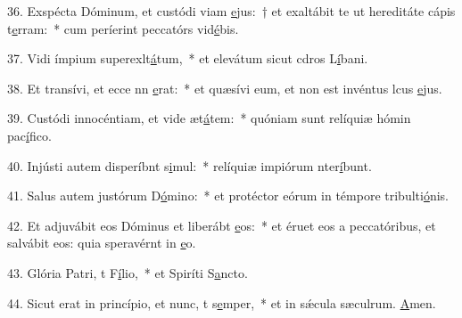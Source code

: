 36. Exspécta Dóminum, et custódi viam \uline{e}jus:~† et exaltábit te ut hereditáte cápis t\uline{e}rram:~* cum períerint peccatórs vid\uline{é}bis.\par 
37. Vidi ímpium superexlt\uline{á}tum,~* et elevátum sicut cdros L\uline{í}bani.\par 
38. Et transívi, et ecce nn \uline{e}rat:~* et quæsívi eum, et non est invéntus lcus \uline{e}jus.\par 
39. Custódi innocéntiam, et vide æt\uline{á}tem:~* quóniam sunt relíquiæ hómin pac\uline{í}fico.\par 
40. Injústi autem disperíbnt s\uline{i}mul:~* relíquiæ impiórum nter\uline{í}bunt.\par 
41. Salus autem justórum  D\uline{ó}mino:~* et protéctor eórum in témpore tribulti\uline{ó}nis.\par 
42. Et adjuvábit eos Dóminus et liberábt \uline{e}os:~* et éruet eos a peccatóribus, et salvábit eos: quia speravérnt in \uline{e}o.\par 
43. Glória Patri, t F\uline{í}lio,~* et Spiríti S\uline{a}ncto.\par 
44. Sicut erat in princípio, et nunc, t s\uline{e}mper,~* et in sǽcula sæculrum. \uline{A}men.\par 
